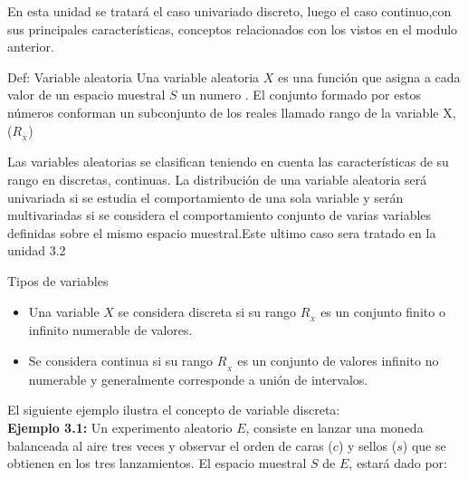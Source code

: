\documentclass[base=hide,12pt]{elegantbook}
\begin{document}
En esta unidad se tratará el  caso univariado discreto, luego el caso continuo,con sus principales características, conceptos relacionados con los vistos en el modulo anterior.



\begin{Box4}{Def: Variable aleatoria}
Una variable aleatoria $X$ es una función que asigna a cada valor de un espacio muestral $S$ un numero . El conjunto formado por estos números conforman un subconjunto de los  reales llamado rango de la variable X, ($R_{_{X}}$) 
\end{Box4}
 Las variables aleatorias se clasifican teniendo en cuenta las características de su rango en discretas, continuas. La distribución de una variable aleatoria será univariada si se estudia el comportamiento de una sola variable y serán multivariadas si se considera el comportamiento conjunto de varias variables definidas sobre el mismo espacio muestral.Este ultimo caso sera tratado en la unidad 3.2\\
\begin{Box2}{Tipos de variables}
\begin{itemize}	
\item Una variable $X$ se considera discreta si su rango $R_{_{X}}$ es un conjunto finito o infinito numerable de valores.
\item Se considera continua si su rango $R_{_{X}}$ es un conjunto de valores infinito no numerable y generalmente corresponde a unión de intervalos.
\end{itemize} 
\end{Box2}
El siguiente ejemplo ilustra el concepto de variable discreta: \\

\textcolor{col3}{\bf Ejemplo 3.1:}   Un experimento aleatorio $E$, consiste en lanzar una moneda balanceada al aire tres veces y observar el orden de caras ($c$) y sellos ($s$) que se obtienen en los tres lanzamientos. El espacio muestral $S$ de $E$, estará dado por:
\end{document}
